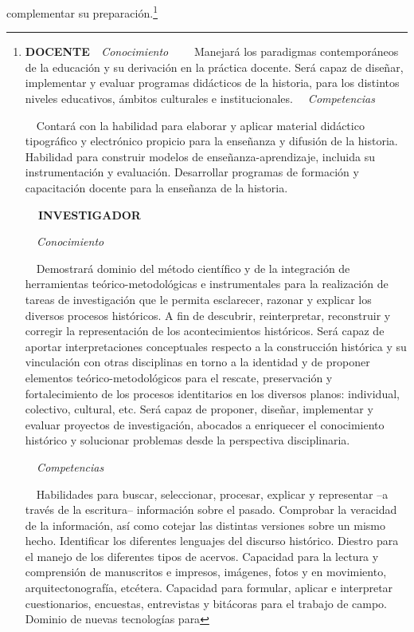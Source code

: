 complementar su preparación.\footnote{\textbf{DOCENTE}\textit{\ \ 
Conocimiento }\ \ \ \ Manejará los paradigmas contemporáneos de la 
educación y su derivación en la práctica docente. Será capaz de 
diseñar, implementar y evaluar programas didácticos de la historia, 
para los distintos niveles educativos, ámbitos culturales e 
institucionales. \textit{\ \ Competencias }\par \ \ Contará con la 
habilidad para elaborar y aplicar material didáctico tipográfico y 
electrónico propicio para la enseñanza y difusión de la historia. 
Habilidad para construir modelos de enseñanza-aprendizaje, incluida su 
instrumentación y evaluación. Desarrollar programas de formación y 
capacitación docente para la enseñanza de la historia.  \par \textbf{\ 
\ INVESTIGADOR }\par \textit{\ \ Conocimiento }\par \ \ Demostrará 
dominio del método científico y de la integración  de herramientas 
teórico-metodológicas e instrumentales para la realización de tareas de 
investigación que le permita esclarecer, razonar y explicar los 
diversos procesos históricos. A fin de  descubrir,  reinterpretar, 
reconstruir y corregir la representación de los acontecimientos 
históricos. Será capaz de aportar interpretaciones conceptuales 
respecto a la construcción histórica y su vinculación con otras 
disciplinas en torno a la identidad y de proponer elementos 
teórico-metodológicos para el rescate, preservación y fortalecimiento 
de los procesos identitarios en los diversos planos: individual, 
colectivo, cultural, etc. Será capaz de proponer, diseñar, implementar 
y evaluar proyectos de investigación, abocados a enriquecer el 
conocimiento histórico y  solucionar problemas desde la perspectiva 
disciplinaria.  \par \textit{\ \ Competencias }\par \ \ Habilidades 
para buscar, seleccionar, procesar, explicar y representar –a través de 
la escritura– información sobre el pasado.  Comprobar la veracidad de 
la información, así como cotejar las distintas versiones sobre un mismo 
hecho. Identificar los diferentes lenguajes del discurso histórico. 
Diestro para el manejo de los diferentes tipos de acervos. Capacidad 
para la lectura y comprensión de manuscritos e impresos, imágenes, 
fotos y en movimiento, arquitectonografía, etcétera.  Capacidad para 
formular, aplicar e interpretar cuestionarios, encuestas, entrevistas y 
bitácoras para el trabajo de campo. Dominio de nuevas tecnologías para 
}
